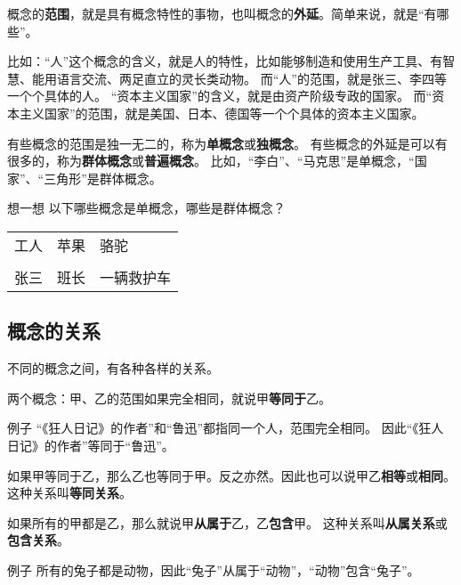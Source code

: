 \documentclass[12pt,UTF8,a4paper]{article}
\begin{document}
概念的\textbf{范围}，就是具有概念特性的事物，也叫概念的\textbf{外延}。简单来说，就是“有哪些”。

比如：“人”这个概念的含义，就是人的特性，比如能够制造和使用生产工具、有智慧、能用语言交流、两足直立的灵长类动物。
而“人”的范围，就是张三、李四等一个个具体的人。
“资本主义国家”的含义，就是由资产阶级专政的国家。
而“资本主义国家”的范围，就是美国、日本、德国等一个个具体的资本主义国家。

有些概念的范围是独一无二的，称为\textbf{单概念}或\textbf{独概念}。
有些概念的外延是可以有很多的，称为\textbf{群体概念}或\textbf{普遍概念}。
比如，“李白”、“马克思”是单概念，“国家”、“三角形”是群体概念。

\begin{blockaft}{想一想}
    \noindent 以下哪些概念是单概念，哪些是群体概念？\\
    \begin{center}
        \begin{tabular}{p{8em}<{\centering} p{8em}<{\centering} p{8em}<{\centering} }
            工人 & 苹果 & 骆驼 \\
            & & \\
            张三 & 班长 & 一辆救护车\\
        \end{tabular}
    \end{center}
\end{blockaft}

\subsection{概念的关系}

不同的概念之间，有各种各样的关系。

两个概念：甲、乙的范围如果完全相同，就说甲\textbf{等同于}乙。

\begin{blockin}{例子}
    “《狂人日记》的作者”和“鲁迅”都指同一个人，范围完全相同。
    因此“《狂人日记》的作者”等同于“鲁迅”。
\end{blockin}

如果甲等同于乙，那么乙也等同于甲。反之亦然。因此也可以说甲乙\textbf{相等}或\textbf{相同}。
这种关系叫\textbf{等同关系}。

如果所有的甲都是乙，那么就说甲\textbf{从属于}乙，乙\textbf{包含}甲。
这种关系叫\textbf{从属关系}或\textbf{包含关系}。

\begin{blockin}{例子}
    所有的兔子都是动物，因此“兔子”从属于“动物”，“动物”包含“兔子”。 
\end{blockin}
\end{document}
